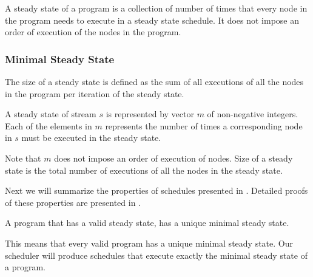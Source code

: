 A steady state of a program is a collection of number of times
that every node in the program needs to execute in a steady state
schedule.  It does not impose an order of execution of the nodes
in the program.
\begin{comment}
Not every {\StreamIt} program has a steady state schedule.  It is
possible for a program to have unbalanced production and
consumption of data in {\splitjoins} and {{\feedbackloops}}. The
amount of data buffered continually increases, and cannot be
reduced, thus making it impossible to create a steady state
schedule for them.  It is also possible that a {{\feedbackloop}}
does not have enough data buffered up internally in order to
complete execution of a full steady state, and thus deadlocks.
Programs without a valid steady state schedule are not considered
valid {\StreamIt} programs. In other words, all valid {\StreamIt}
programs have a steady state schedule.
\end{comment}

\subsubsection{Minimal Steady State}

The size of a steady state is defined as the sum of all executions
of all the nodes in the program per iteration of the steady state.

\begin{definition}
A steady state of stream $s$ is represented by vector $m$ of
non-negative integers. Each of the elements in $m$ represents the
number of times a corresponding node in $s$ must be executed in
the steady state.
\end{definition}

Note that $m$ does not impose an order of execution of nodes. Size
of a steady state is the total number of executions of all the
nodes in the steady state.

Next we will summarize the properties of schedules presented in
\cite{lee87static}. Detailed proofs of these properties are
presented in \cite{karczma-thesis}.

\begin{theorem}
A {\StreamIt} program that has a valid steady state, has a unique
minimal steady state.
\end{theorem}

This means that every valid {\StreamIt} program has a unique minimal
steady state. Our scheduler will produce schedules that execute
exactly the minimal steady state of a program.

